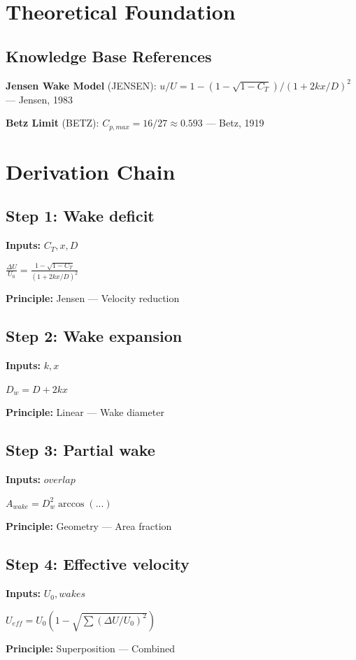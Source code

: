 \documentclass[11pt,twocolumn]{article}
\begin{document}
\section{Theoretical Foundation}

\subsection{Knowledge Base References}
\textbf{Jensen Wake Model} (JENSEN): $u/U = 1 - (1-\sqrt{1-C_T})/(1+2kx/D)^2$ --- Jensen, 1983

\textbf{Betz Limit} (BETZ): $C_{p,max} = 16/27 \approx 0.593$ --- Betz, 1919


\section{Derivation Chain}

\subsection*{Step 1: Wake deficit}
\textbf{Inputs:} $C_T, x, D$

$\frac{\Delta U}{U_0} = \frac{1-\sqrt{1-C_T}}{(1+2kx/D)^2}$

\textbf{Principle:} Jensen --- Velocity reduction

\subsection*{Step 2: Wake expansion}
\textbf{Inputs:} $k, x$

$D_w = D + 2kx$

\textbf{Principle:} Linear --- Wake diameter

\subsection*{Step 3: Partial wake}
\textbf{Inputs:} $overlap$

$A_{wake} = D_w^2 \arccos(...)$

\textbf{Principle:} Geometry --- Area fraction

\subsection*{Step 4: Effective velocity}
\textbf{Inputs:} $U_0, wakes$

$U_{eff} = U_0(1 - \sqrt{\sum(\Delta U/U_0)^2})$

\textbf{Principle:} Superposition --- Combined
\end{document}
